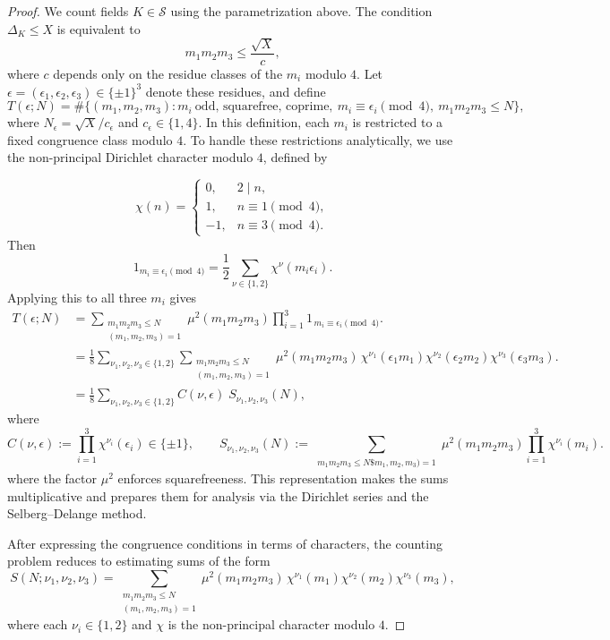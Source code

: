 \documentclass[12 pt]{amsart}
\newcommand{\cS}{\mathcal{S}}
\theoremstyle{definition}
\theoremstyle{remark}
\begin{document}
\begin{proof}
	We count fields $K\in\cS$ using the parametrization above. 
	The condition $\Delta_K \le X$ is equivalent to
	\[
	m_1 m_2 m_3 \le \frac{\sqrt{X}}{c},
	\]
	where $c$ depends only on the residue classes of the $m_i$ modulo $4$. 
	Let $\epsilon=(\epsilon_1,\epsilon_2,\epsilon_3)\in\{\pm1\}^3$ denote these residues, 
	and define
	\[
	T(\epsilon;N)
	= \#\{(m_1,m_2,m_3): m_i\ \text{odd, squarefree, coprime},\
	m_i\equiv\epsilon_i\pmod4,\
	m_1m_2m_3\le N\},
	\]
	where $N_\epsilon=\sqrt{X}/c_\epsilon$ and $c_\epsilon\in\{1,4\}$.
		In this definition, each $m_i$ is restricted to a fixed congruence class modulo $4$. 
	To handle these restrictions analytically, we use the non-principal Dirichlet character modulo $4$, defined by
	
	\[
	\chi(n)=
	\begin{cases}
		0,&2\mid n,\\
		1,&n\equiv1\pmod4,\\
		-1,&n\equiv3\pmod4.
	\end{cases}
	\]
	Then
	\[
	1_{m_i\equiv\epsilon_i\pmod4}
	=\frac{1}{2}\sum_{\nu\in\{1,2\}}\chi^\nu(m_i\epsilon_i).
	\]
	Applying this to all three $m_i$ gives
\begin{align*}
		T(\epsilon;N)&
		= \sum_{\substack{m_1m_2m_3 \le N \\ (m_1,m_2,m_3)=1}}
		\mu^2(m_1m_2m_3)
		\prod_{i=1}^{3} 1_{\,m_i \equiv \epsilon_i \pmod{4}}.\\
&	= \frac{1}{8}\!\!\!\sum_{\nu_1,\nu_2,\nu_3\in\{1,2\}}
	\sum_{\substack{m_1m_2m_3\le N \\ (m_1,m_2,m_3)=1}}
	\mu^2(m_1m_2m_3)\,
	\chi^{\nu_1}(\epsilon_1 m_1)\chi^{\nu_2}(\epsilon_2 m_2)\chi^{ \nu_3}(\epsilon_3 m_3).\\
	&= \frac{1}{8}\sum_{\nu_1,\nu_2,\nu_3\in\{1,2\}}
	C(\nu,\epsilon)\;
	S_{\nu_1,\nu_2,\nu_3}(N),
\end{align*}
where
\[
C(\nu,\epsilon):=\prod_{i=1}^3\chi^{\nu_i}(\epsilon_i)\in\{\pm1\},
\qquad
S_{\nu_1,\nu_2,\nu_3}(N)
:=\sum_{\substack{m_1m_2m_3\le N\$m_1,m_2,m_3)=1}}
\mu^2(m_1m_2m_3)\prod_{i=1}^3\chi^{\nu_i}(m_i).
\]
	where the factor $\mu^2$ enforces squarefreeness.  This representation makes the
sums multiplicative and prepares them for analysis via the Dirichlet series and the
Selberg--Delange method.

	\noindent	After expressing the congruence conditions in terms of characters,
the counting problem reduces to estimating sums of the form
\[
S(N;\nu_1,\nu_2,\nu_3)
= \sum_{\substack{m_1m_2m_3\le N \\ (m_1,m_2,m_3)=1}}
\mu^2(m_1m_2m_3)\,
\chi^{\nu_1}(m_1)\chi^{\nu_2}(m_2)\chi^{\nu_3}(m_3),
\]
where each $\nu_i\in\{1,2\}$ and $\chi$ is the non-principal character modulo $4$.


\end{proof}
\end{document}

